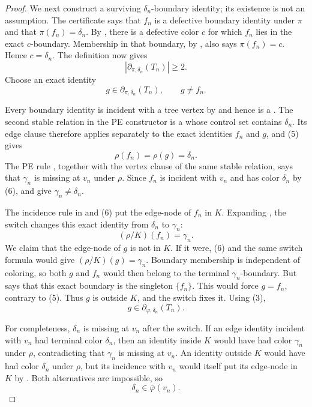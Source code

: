 \begin{proof}
We next construct a surviving $\delta_n$-boundary identity; its existence
is not an assumption.  The certificate 
says that $f_n$ is a defective boundary identity under $\pi$ and that
\(\pi(f_n)=\delta_n\).  By , there is a defective
color $c$ for which $f_n$ lies in the exact $c$-boundary.  Membership in
that boundary, by , also says
\(\pi(f_n)=c\).  Hence $c=\delta_n$.  The definition
 now gives
\[
                    |\partial_{\pi,\delta_n}(T_n)|\geq2.         \tag{4}
\]
Choose an exact identity
\[
 g\in\partial_{\pi,\delta_n}(T_n),\qquad g\ne f_n.              \tag{5}
\]

Every boundary identity is incident with a tree vertex by
 and hence is a
.  The second stable relation in the PE
constructor is a  whose control set contains
$\delta_n$.  Its edge clause therefore applies separately to the exact
identities $f_n$ and $g$, and (5) gives
\[
                         \rho(f_n)=\rho(g)=\delta_n.              \tag{6}
\]
The PE rule , together with the vertex
clause of the same stable relation, says that $\gamma_n$ is missing at
$v_n$ under $\rho$.  Since $f_n$ is incident with $v_n$ and has color
$\delta_n$ by (6),  and
 give $\gamma_n\ne\delta_n$.

The incidence rule in  and (6) put the
edge-node of $f_n$ in $K$.  Expanding
, the switch changes this exact identity
from $\delta_n$ to $\gamma_n$:
\[
                         (\rho/K)(f_n)=\gamma_n.                  \tag{7}
\]
We claim that the edge-node of $g$ is not in $K$.  If it were, (6) and
the same switch formula would give $(\rho/K)(g)=\gamma_n$.  Boundary
membership is independent of coloring, so both $g$ and $f_n$ would then
belong to the terminal $\gamma_n$-boundary.  But
 says that this exact boundary is
the singleton $\{f_n\}$.  This would force $g=f_n$, contrary to (5).
Thus $g$ is outside $K$, and the switch fixes it.  Using (3),
\[
                   g\in\partial_{\varphi,\delta_n}(T_n).         \tag{8}
\]

For completeness, $\delta_n$ is missing at $v_n$ after the switch.  If
an edge identity incident with $v_n$ had terminal color $\delta_n$, then
an identity inside $K$ would have had color $\gamma_n$ under $\rho$,
contradicting that $\gamma_n$ is missing at $v_n$.  An identity outside
$K$ would have had color $\delta_n$ under $\rho$, but its incidence with
$v_n$ would itself put its edge-node in $K$ by
.  Both alternatives are impossible, so
\[
                       \delta_n\in\overline\varphi(v_n).         \tag{9}
\]


\end{proof}
